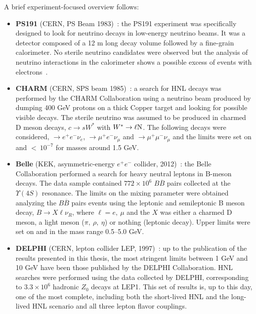 A brief experiment-focused overview follows:
\begin{itemize}
\item \textbf{PS191} (CERN, PS Beam 1983)~\cite{BERNARDI1988332}: the PS191
  experiment was specifically designed to look for neutrino decays in
  low-energy neutrino beams. It was a detector composed of a 12 m long
  decay volume followed by a fine-grain calorimeter. No sterile
  neutrino candidates were observed but the analysis of neutrino
  interactions in the calorimeter shows a possible excess of events
  with electrons~\cite{Vannucci:1985vs}.
\item \textbf{CHARM} (CERN, SPS beam 1985)~\cite{DORENBOSCH1986473}: a search
  for HNL decays  was performed by the CHARM Collaboration using a
  neutrino beam produced by dumping 400 GeV protons on a thick Copper
  target and looking for possible visible decays. The sterile neutrino was assumed to be produced in charmed D meson decays, \ie $c\rightarrow s W^{*}$ with $W^{*} \rightarrow \ell \mathrm{N}$. The following decays were considered, \hnl $\rightarrow
  e^+e^-\nu_e$, $\rightarrow \mu^+e^-\nu_\mu$ and $\rightarrow
  \mu^+\mu^-\nu_\mu$ and the limits were set on \mixpare and
  \mixparm $< \:10^{-7}$ for \hnl masses around 1.5 GeV. 
\item \textbf{Belle} (KEK, asymmetric-energy $e^+e^-$ collider, 2012)~\cite{Liventsev_2013}: the Belle Collaboration
  performed a search for heavy neutral leptons in B-meson
  decays. The data sample contained $772\times 10^6$ $B\overline{B}$
  pairs collected at the $\Upsilon(4S)$ resonance. The limits
  on the mixing parameter were obtained analyzing the $B\overline{B}$ pairs
  events using the leptonic and semileptonic B meson decay,
  $B\rightarrow X\ell\nu_R$, where $\ell = e, \: \mu$ and the $X$ was
  either a charmed D meson, a light meson ($\pi, \: \rho, \: \eta$) or
  nothing (leptonic decay). Upper limits were set on \mixpare and
  \mixparm in the mass range 0.5--5.0 GeV. 
\item \textbf{DELPHI} (CERN, lepton collider LEP, 1997)~\cite{Abreu:1996pa}:
  up to the publication of the results presented in this thesis, the most stringent limits between 1 GeV and 10 GeV have been those published by the DELPHI Collaboration. HNL searches were performed
  using the data collected by DELPHI, corresponding to $3.3
  \times 10^6$ hadronic $Z_0$ decays at LEP1. This set of results is, up to
  this day, one of the most complete, including both the short-lived HNL and the long-lived
  HNL scenario and all three lepton flavor couplings. 

\end{itemize}
